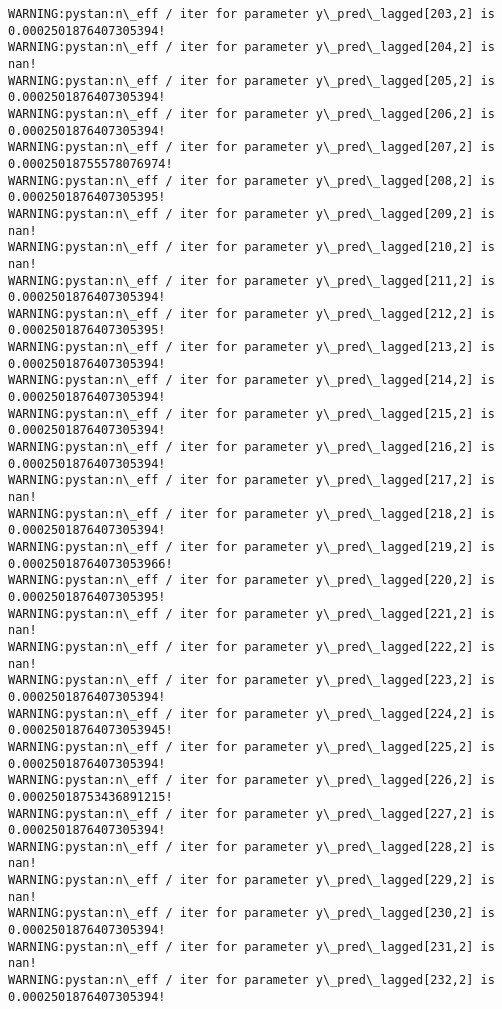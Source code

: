 \documentclass[11pt]{article}
\begin{document}
\begin{Verbatim}[commandchars=\\\{\}]
WARNING:pystan:n\_eff / iter for parameter y\_pred\_lagged[203,2] is 0.0002501876407305394!
WARNING:pystan:n\_eff / iter for parameter y\_pred\_lagged[204,2] is nan!
WARNING:pystan:n\_eff / iter for parameter y\_pred\_lagged[205,2] is 0.0002501876407305394!
WARNING:pystan:n\_eff / iter for parameter y\_pred\_lagged[206,2] is 0.0002501876407305394!
WARNING:pystan:n\_eff / iter for parameter y\_pred\_lagged[207,2] is 0.00025018755578076974!
WARNING:pystan:n\_eff / iter for parameter y\_pred\_lagged[208,2] is 0.0002501876407305395!
WARNING:pystan:n\_eff / iter for parameter y\_pred\_lagged[209,2] is nan!
WARNING:pystan:n\_eff / iter for parameter y\_pred\_lagged[210,2] is nan!
WARNING:pystan:n\_eff / iter for parameter y\_pred\_lagged[211,2] is 0.0002501876407305394!
WARNING:pystan:n\_eff / iter for parameter y\_pred\_lagged[212,2] is 0.0002501876407305395!
WARNING:pystan:n\_eff / iter for parameter y\_pred\_lagged[213,2] is 0.0002501876407305394!
WARNING:pystan:n\_eff / iter for parameter y\_pred\_lagged[214,2] is 0.0002501876407305394!
WARNING:pystan:n\_eff / iter for parameter y\_pred\_lagged[215,2] is 0.0002501876407305394!
WARNING:pystan:n\_eff / iter for parameter y\_pred\_lagged[216,2] is 0.0002501876407305394!
WARNING:pystan:n\_eff / iter for parameter y\_pred\_lagged[217,2] is nan!
WARNING:pystan:n\_eff / iter for parameter y\_pred\_lagged[218,2] is 0.0002501876407305394!
WARNING:pystan:n\_eff / iter for parameter y\_pred\_lagged[219,2] is 0.00025018764073053966!
WARNING:pystan:n\_eff / iter for parameter y\_pred\_lagged[220,2] is 0.0002501876407305395!
WARNING:pystan:n\_eff / iter for parameter y\_pred\_lagged[221,2] is nan!
WARNING:pystan:n\_eff / iter for parameter y\_pred\_lagged[222,2] is nan!
WARNING:pystan:n\_eff / iter for parameter y\_pred\_lagged[223,2] is 0.0002501876407305394!
WARNING:pystan:n\_eff / iter for parameter y\_pred\_lagged[224,2] is 0.00025018764073053945!
WARNING:pystan:n\_eff / iter for parameter y\_pred\_lagged[225,2] is 0.0002501876407305394!
WARNING:pystan:n\_eff / iter for parameter y\_pred\_lagged[226,2] is 0.00025018753436891215!
WARNING:pystan:n\_eff / iter for parameter y\_pred\_lagged[227,2] is 0.0002501876407305394!
WARNING:pystan:n\_eff / iter for parameter y\_pred\_lagged[228,2] is nan!
WARNING:pystan:n\_eff / iter for parameter y\_pred\_lagged[229,2] is nan!
WARNING:pystan:n\_eff / iter for parameter y\_pred\_lagged[230,2] is 0.0002501876407305394!
WARNING:pystan:n\_eff / iter for parameter y\_pred\_lagged[231,2] is nan!
WARNING:pystan:n\_eff / iter for parameter y\_pred\_lagged[232,2] is 0.0002501876407305394!

\end{Verbatim}
\end{document}
